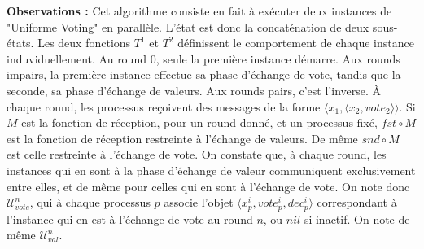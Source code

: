 \documentclass{article}
\begin{document}
\textbf{Observations :} Cet algorithme consiste en fait à exécuter deux instances de "Uniforme Voting" en parallèle.
L'état est donc la concaténation de deux sous-états.
Les deux fonctions $T^1$ et $T^2$ définissent le comportement de chaque instance induviduellement.
Au round $0$, seule la première instance démarre.
Aux rounds impairs, la première instance effectue sa phase d'échange de vote, tandis que la seconde, sa phase d'échange de valeurs.
Aux rounds pairs, c'est l'inverse.
À chaque round, les processus reçoivent des messages de la forme $\langle x_1 , \langle x_2, vote_2 \rangle \rangle$.
Si $M$ est la fonction de réception, pour un round donné, et un processus fixé, $fst \circ M$ est la fonction de réception restreinte à l'échange de valeurs.
De même $snd \circ M$ est celle restreinte à l'échange de vote.
On constate que, à chaque round, les instances qui en sont à la phase d'échange de valeur communiquent exclusivement entre elles, et de même pour celles qui en sont à l'échange de vote.
On note donc $\mathcal{U}_{vote}^n$, qui à chaque processus $p$ associe l'objet $\langle x^i_p, vote^i_p, dec^i_p \rangle$
correspondant à l'instance qui en est à l'échange de vote au round $n$, ou $nil$ si inactif. On note de même $\mathcal{U}_{val}^n$.
\end{document}
